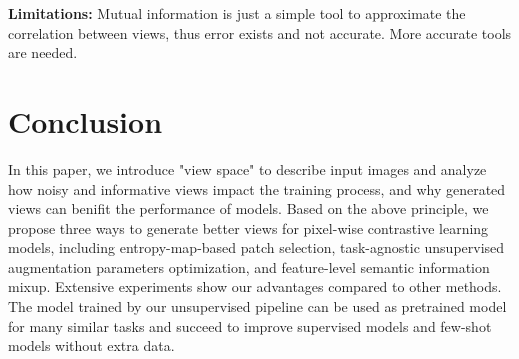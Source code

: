 \documentclass[10pt,twocolumn,letterpaper]{article}
\begin{document}
{\bf Limitations:}
Mutual information is just a simple tool to approximate the correlation between views, thus error exists and not accurate. More accurate tools are needed. 


\section{Conclusion}
In this paper, we introduce "view space" to describe input images and analyze how noisy and informative views impact the training process, and why generated views can benifit the performance of models. 
Based on the above principle, we propose three ways to generate better views for pixel-wise contrastive learning models, including entropy-map-based patch selection, task-agnostic unsupervised augmentation parameters optimization, and feature-level semantic information mixup. 
Extensive experiments show our advantages compared to other methods. The model trained by our unsupervised pipeline can be used as pretrained model for many similar tasks and succeed to improve supervised models and few-shot models without extra data. 


{\small


}
\end{document}
